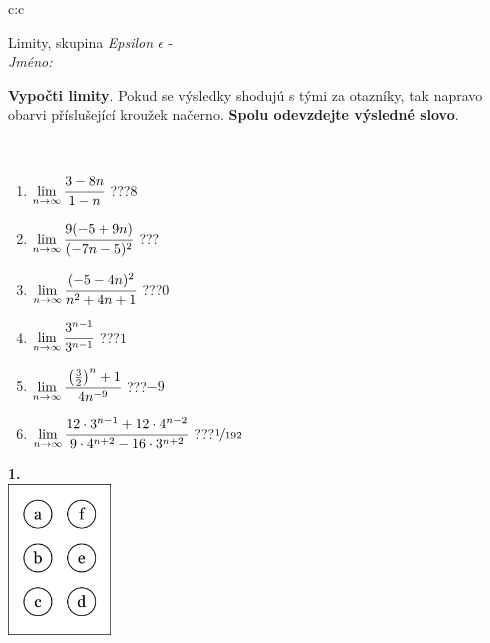 \documentclass[10pt]{report}
\begin{document}
\begin{tabular}{c:c}
\begin{minipage}[c][104.5mm][t]{0.5\linewidth}
\begin{center}
\vspace{7mm}
{\huge Limity, skupina \textit{Epsilon $\epsilon$} -}\\[5mm]
\textit{Jméno:}\phantom{xxxxxxxxxxxxxxxxxxxxxxxxxxxxxxxxxxxxxxxxxxxxxxxxxxxxxxxxxxxxxxxxx}\\[5mm]
\begin{minipage}{0.95\linewidth}
\begin{center}
\textbf{Vypočti limity}. Pokud se výsledky shodujú s tými za otazníky, tak napravo\\obarvi příslušející kroužek načerno. \textbf{Spolu odevzdejte výsledné slovo}.
\end{center}
\end{minipage}
\\[1mm]
\begin{minipage}{0.79\linewidth}
\begin{center}
\begin{varwidth}{\linewidth}
\begin{enumerate}
\normalsize
\item $\lim\limits_{n\to\infty}\cfrac{3-8n}{1-n}$\quad \dotfill\; ???\;\dotfill \quad $8$
\item $\lim\limits_{n\to\infty}\cfrac{9(-5+9n)}{(-7n-5)^2}$\quad \dotfill\; ???\;\dotfill {}
\item $\lim\limits_{n\to\infty}\cfrac{(-5-4n)^2}{n^2+4n+1}$\quad \dotfill\; ???\;\dotfill \quad $0$
\item $\lim\limits_{n\to\infty}\cfrac{3^{n-1}}{3^{n-1}}$\quad \dotfill\; ???\;\dotfill \quad $1$
\item $\lim\limits_{n\to\infty}\cfrac{\left(\frac{3}{2}\right)^n +1}{4n^{-9}}$\quad \dotfill\; ???\;\dotfill \quad $-9$
\item $\lim\limits_{n\to\infty}\cfrac{12\cdot 3^{n-1}+12\cdot 4^{n-2}}{9\cdot 4^{n+2}-16\cdot 3^{n+2}}$\quad \dotfill\; ???\;\dotfill \quad $\nicefrac{1}{192}$
\end{enumerate}
\end{varwidth}
\end{center}
\end{minipage}
\begin{minipage}{0.20\linewidth}
\begin{center}
{\Huge\bfseries 1.} \\[2mm]
\includegraphics[height=40mm]{../images/braille.png}

\end{center}
\end{minipage}
\end{center}
\end{minipage}
\end{tabular}
\end{document}
